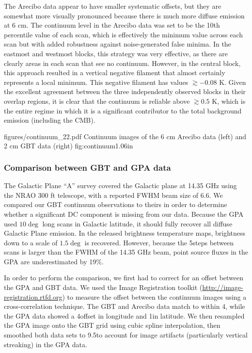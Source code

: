 The Arecibo data appear to have smaller systematic offsets, but they are
somewhat more visually pronounced because there is much more diffuse emission
at 6 cm.  The continuum level in the Arecibo data was set to be the 10th
percentile value of each scan, which is effectively the minimum value across
each scan but with added robustness against noise-generated false minima.  In
the eastmost and westmost blocks, this strategy was very effective, as there
are clearly areas in each scan that see no continuum.  However, in the central
block, this approach resulted in a vertical negative filament that almost
certainly represents a local minimum.  This negative filament has values
$\gtrsim-0.08$ K.  Given the excellent agreement between the three
independently observed blocks in their overlap regions, it is clear that the
continuum is reliable above $\gtrsim0.5$ K, which is the entire regime in which
it is a significant contributor to the total background emission (including the
CMB).

            {figures/continuum_22.pdf}
{Continuum images of the 6 cm Arecibo data (left) and 2 cm GBT data (right)}
{fig:continuum}{1.0}{6in}


\subsubsection{Comparison between GBT and GPA data}
\label{sec:gpacompare}
The Galactic Plane ``A'' survey \citep{Langston2000a} covered the Galactic
plane at 14.35 GHz using the NRAO 300 ft telescope, with a reported FWHM beam
size of 6.6\arcmin.  We compared our GBT continuum observations to theirs in
order to determine whether a significant DC component is missing from our data.
Because the GPA used $10\deg$ long scans in Galactic latitude, it should fully
recover all diffuse Galactic Plane emission.  In the released brightness temperature
maps, brightness down to a scale of $1.5\deg$ is recovered.  However, because the
5\arcmin steps between scans is larger than the FWHM of the 14.35 GHz beam,
point source fluxes in the GPA are underestimated by 19\%.

In order to perform the comparison, we first had to correct for an offset
between the GPA and GBT data.  We used the Image Registration toolkit
(\url{http://image-registration.rtfd.org}) to measure the offset between the continuum
images using a cross-correlation technique.
The GBT and Arecibo data match to within 4\arcsec, while the GPA data showed
a 4\arcmin offset in longitude and 1\arcmin in latitude.  We then resampled
the GPA image onto the GBT grid using cubic spline interpolation, then smoothed
both data sets to 9.5\arcmin to account for image artifacts (particularly
vertical streaking) in the GPA data.

